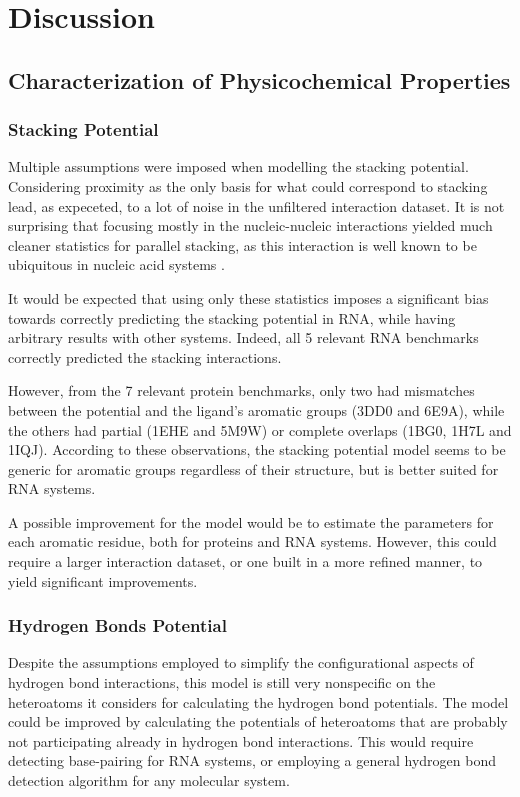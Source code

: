 \chapter{Discussion} %

\section{Characterization of Physicochemical Properties}
  \subsection{Stacking Potential}
    Multiple assumptions were imposed when modelling the stacking potential. Considering proximity as the only basis for what could correspond to stacking lead, as expeceted, to a lot of noise in the unfiltered interaction dataset. It is not surprising that focusing mostly in the nucleic-nucleic interactions yielded much cleaner statistics for parallel stacking, as this interaction is well known to be ubiquitous in nucleic acid systems \cite{rna_2015}.

    It would be expected that using only these statistics imposes a significant bias towards correctly predicting the stacking potential in RNA, while having arbitrary results with other systems. Indeed, all 5 relevant RNA benchmarks correctly predicted the stacking interactions.

    However, from the 7 relevant protein benchmarks, only two had mismatches between the potential and the ligand's aromatic groups (3DD0 and 6E9A), while the others had partial (1EHE and 5M9W) or complete overlaps (1BG0, 1H7L and 1IQJ). According to these observations, the stacking potential model seems to be generic for aromatic groups regardless of their structure, but is better suited for RNA systems.

    A possible improvement for the model would be to estimate the parameters for each aromatic residue, both for proteins and RNA systems. However, this could require a larger interaction dataset, or one built in a more refined manner, to yield significant improvements.

  \subsection{Hydrogen Bonds Potential}
    Despite the assumptions employed to simplify the configurational aspects of hydrogen bond interactions, this model is still very nonspecific on the heteroatoms it considers for calculating the hydrogen bond potentials. The model could be improved by calculating the potentials of heteroatoms that are probably not participating already in hydrogen bond interactions. This would require detecting base-pairing for RNA systems, or employing a general hydrogen bond detection algorithm for any molecular system.

